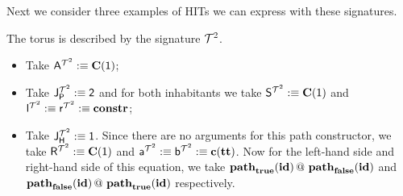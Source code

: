 Next we consider three examples of HITs we can express with these signatures.

\begin{example}
\label{ex:torus}
The torus is described by the signature $\torus$.
\begin{itemize}
	\item Take $\pointconstr[\torus] \eqdef \constantP{\unit}$;
	\item Take $\pathlabel[\torus] \eqdef \bool$ and for both inhabitants we take $\patharg[\torus] \eqdef \constantP{\unit}$ and $\pathleft[\torus] \eqdef \pathright[\torus] \eqdef \constr$;
	\item Take $\homotlabel[\torus] \eqdef \unit$.
	Since there are no arguments for this path constructor, we take $\homotpointarg[\torus] \eqdef \constantP{\unit}$ and $\pathargleft[\torus] \eqdef \pathargright[\torus] \eqdef \Ce(\unitt)$.
	Now for the left-hand side and right-hand side of this equation, we take $\hconcat{\hconstr{\booltrue}{\idENA}}{\hconstr{\boolfalse}{\idENA}}$ and $\hconcat{\hconstr{\boolfalse}{\idENA}}{\hconstr{\booltrue}{\idENA}}$ respectively. 
\end{itemize}
\end{example}

